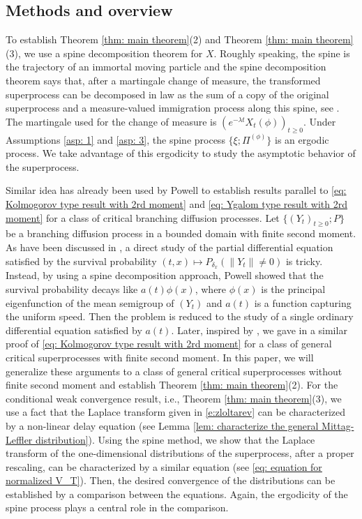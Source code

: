 \documentclass[12pt,a4paper]{amsart}
\theoremstyle{definition}
\numberwithin{equation}{section}
\begin{document}
\subsection{Methods and overview}
	
To establish Theorem \ref{thm: main theorem}(2) and Theorem \ref{thm: main theorem}(3), we use a spine decomposition theorem for 	$X$.
  Roughly speaking, the spine is the trajectory of an immortal moving particle and the spine decomposition theorem says that, after a martingale change of measure, the transformed superprocess can be decomposed in law as the sum of a copy of the original superprocess and a measure-valued immigration process along this spine, see \cite{EckhoffKyprianouWinkel2015Spines, EnglanderKyprianou2004Local, LiuRenSong2009Llog}.
The martingale used for the change of measure is $(e^{-\lambda t} X_t(\phi))_{t\geq 0}$.
Under Assumptions \ref{asp: 1} and \ref{asp: 3}, the spine process $\{\xi; \Pi^{(\phi)}\}$ is an ergodic process.
We take advantage of this ergodicity to study the asymptotic behavior of the superprocess.
	
Similar idea has already been used by Powell \cite{Powell2015An-invariance} to establish results parallel to \eqref{eq: Kolmogorov type result with 2rd moment} and \eqref{eq: Ygalom type result with 2rd moment} for a class of critical branching diffusion processes.
Let $\{(Y_t)_{t\geq 0}; P\}$ be a branching diffusion process in a bounded domain with finite second moment.
As have been discussed in \cite{Powell2015An-invariance}, a direct study of the partial differential equation satisfied by the survival probability $(t,x) \mapsto P_{\delta_x}(\|Y_t\| \neq 0)$ is tricky.
Instead, by using a spine decomposition approach, Powell \cite{Powell2015An-invariance} showed that the survival probability decays like $a(t)\phi(x)$, where $\phi(x)$ is the principal eigenfunction of the mean semigroup of $(Y_t)$ and $a(t)$ is a function capturing the uniform speed.
Then the problem is reduced to the study of a single ordinary differential equation satisfied by $a(t)$.
Later, inspired by \cite{Powell2015An-invariance}, we gave in \cite{RenSongSun2017Spine} a similar proof of \eqref{eq: Kolmogorov type result with 2rd moment} for a class of general critical superprocesses with finite second moment.
In this paper, we will  generalize these arguments to a class of general critical superprocesses without finite second moment and establish Theorem \ref{thm: main theorem}(2).
For the conditional weak convergence result, i.e., Theorem \ref{thm: main theorem}(3), we use a fact that the Laplace transform given in \eqref{e:zloltarev} can be characterized by a non-linear delay equation (see Lemma \ref{lem: characterize the general Mittag-Leffler distribution}).
Using the spine method, we show that the Laplace transform of the one-dimensional distributions of the superprocess, after a proper rescaling, can be 	characterized by a similar equation (see \eqref{eq: equation for normalized V_T}).
Then, the desired convergence of the distributions can be established by a comparison between the equations.	
Again, the ergodicity of the spine process plays a central role in the comparison.
	
\end{document}
